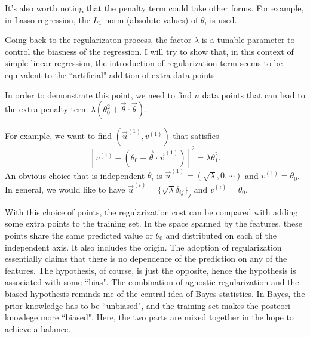 It's also worth noting that the penalty term could take other forms. For example, in Lasso regression, the $L_1$ norm (absolute values) of $\theta_i$ is used.

Going back to the regularizaton process, the factor $\lambda$ is a tunable parameter to control the biasness of the regression. I will try to show that, in this
context of simple linear regression, the introduction of regularization term seems to be equivalent to the ``artificial" addition of extra data points.

In order to demonstrate this point, we need to find $n$ data points that can lead to the extra penalty term $\lambda(\theta_0^2+\vec\theta\cdot\vec\theta)$.

For example, we want to find $(\vec u^{(1)}, v^{(1)})$ that satisfies 
\begin{equation}
\left[v^{(1)} - \left(\theta_0 + \vec\theta\cdot\vec v^{(1)}\right)\right]^2 = \lambda\theta_1^2.
\end{equation}
An obvious choice that is independent $\theta_i$ is $\vec u^{(1)} = (\sqrt\lambda, 0, \cdots)$ and $v^{(1)} = \theta_0$.
In general, we would like to have $\vec u^{(i)} = \{\sqrt\lambda\delta_{ij}\}_j$ and $v^{(i)} = \theta_0$\footnotemark{}.  

With this choice of points, the regularization cost can be compared with adding some extra points to the training set. In the space spanned by 
the features, these points share the same predicted value or $\theta_0$ and distributed on each of the independent axis. It also includes the origin. The adoption 
of regularization essentially claims that there is no dependence of the prediction on any of the features. The hypothesis, of course, is just the opposite, hence
the hypothesis is associated with some ``bias". The combination of agnostic regularization and the biased hypothesis reminds me of the central idea of
Bayes statistics. In Bayes, the prior knowledge has to be ``unbiased", and the training set makes the posteori knowlege more ``biased". Here, the
two parts are mixed together in the hope to achieve a balance.


